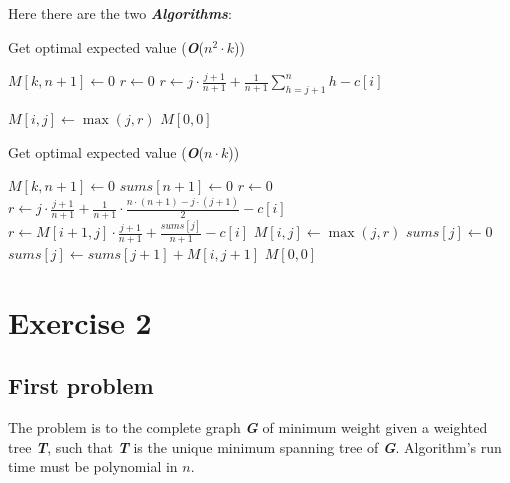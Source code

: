 \documentclass[11pt]{article}
\begin{document}
Here there are the two \textbf{\textit{Algorithms}}:

\begin{minipage}[t]{0.49\textwidth}
\begin{algorithm}[H]
	\caption{Get optimal expected value (\textbf{\textit{O}}($n^2 \cdot k$))}\label{euclid}
	\begin{algorithmic}[1]
		\State $M[k, n+1] \gets 0$
		\State $r \gets 0$
		\State $r \gets j \cdot \frac{j+1}{n+1} + \frac{1}{n+1}\sum\limits_{h = j + 1}^n{h} - c[i]$
		\Else
		\State \begin{varwidth}[t]{\linewidth} $r \gets M[i+1, j] \cdot \frac{j+1}{n+1} + \frac{1}{n+1} \cdot$ \par
			\hskip\algorithmicindent $\sum\limits_{h = j + 1}^n{M[i+1, h]} - c[i]$
		\end{varwidth}
		\EndIf
		\State $M[i, j] \gets \max(j, r)$
		\EndFor		
		\EndFor
		\State \Return $M[0, 0]$
	\end{algorithmic}
\end{algorithm}
\end{minipage}
\hfill
\begin{minipage}[t]{0.49\textwidth}
\begin{algorithm}[H]
	\caption{Get optimal expected value (\textbf{\textit{O}}($n \cdot k$))}\label{euclid}
	\begin{algorithmic}[1]
		\State $M[k, n+1] \gets 0$
		\State $sums[n+1] \gets 0$
		\State $r \gets 0$
			\State $r \gets j \cdot \frac{j+1}{n+1} + \frac{1}{n+1} \cdot \frac{n \cdot (n+1)-j \cdot (j+1)}{2} - c[i]$
		\Else
			\State $r \gets M[i+1, j] \cdot \frac{j+1}{n+1} + \frac{sums[j]}{n+1} - c[i]$
		\EndIf
		\State $M[i, j] \gets \max(j, r)$
			\State $sums[j] \gets 0$
		\Else
			\State $sums[j] \gets sums[j+1] + M[i, j+1]$
		\EndIf
		\EndFor		
		\EndFor
		\State \Return $M[0, 0]$
	\end{algorithmic}
\end{algorithm}
\end{minipage}
\newpage

\section*{Exercise 2}
\subsection*{First problem}
The problem is to the complete graph \textbf{\textit{G}} of minimum weight given a weighted tree \textbf{\textit{T}}, such that  \textbf{\textit{T}} is the unique minimum spanning tree of \textbf{\textit{G}}. Algorithm's run time must be polynomial in $n$.
\end{document}
